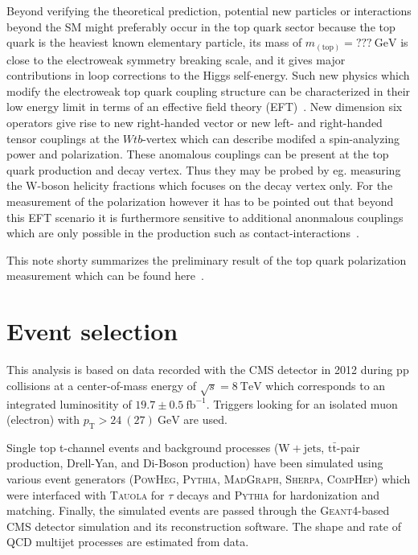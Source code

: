 \documentclass[a4paper]{jpconf}
\newcommand{\unit}[1]{\ensuremath{\mathrm{~#1}}}
\newcommand{\wjets}[0]{\mathrm{W+jets}}
\newcommand{\particle}[1]{\ensuremath{#1}}
\newcommand{\ttbar}[0]{\ensuremath{\mathrm{t\bar{t}}}}
\newcommand{\pT}[0]{\ensuremath{p_\mathrm{T}}}
\begin{document}
Beyond verifying the theoretical prediction, potential new particles or interactions beyond the SM might preferably occur in the top quark sector because the top quark is the heaviest known elementary particle, its mass of $m_{\mathrm{(top)}}=???\unit{GeV}$ is close to the electroweak symmetry breaking scale, and it gives major contributions in loop corrections to the Higgs self-energy. Such new physics which modify the electroweak top quark coupling structure can be characterized in their low energy limit in terms of an effective field theory (EFT)~\cite{jaaswpol}. New dimension six operators give rise to new right-handed vector or new left- and right-handed tensor couplings at the $\particle{Wtb}$-vertex which can describe modifed a spin-analyzing power and polarization. These anomalous couplings can be present at the top quark production and decay vertex. Thus they may be probed by eg. measuring the W-boson helicity fractions which focuses on the decay vertex only. For the measurement of the polarization however it has to be pointed out that beyond this EFT scenario it is furthermore sensitive to additional anonmalous couplings which are only possible in the production such as contact-interactions~\cite{fabian}.


This note shorty summarizes the preliminary result of the top quark polarization measurement which can be found here~\cite{stpol}.


\section{Event selection}
This analysis is based on data recorded with the CMS detector in 2012 during pp collisions at a center-of-mass energy of $\sqrt{s}=8\unit{TeV}$ which corresponds to an integrated luminositity of $19.7\pm0.5\unit{fb^{-1}}$. Triggers looking for an isolated muon (electron) with $\pT>24~(27)\unit{GeV}$ are used.


Single top t-channel events and background processes ($\wjets$, $\ttbar$-pair production, Drell-Yan, and Di-Boson production) have been simulated using various event generators (\textsc{PowHeg}, \textsc{Pythia}, \textsc{MadGraph}, \textsc{Sherpa}, \textsc{CompHep}) which were interfaced with \textsc{Tauola} for $\tau$ decays and \textsc{Pythia} for hardonization and matching. Finally, the simulated events are passed through the \textsc{Geant4}-based CMS detector simulation and its reconstruction software. The shape and rate of QCD multijet processes are estimated from data.
\end{document}
